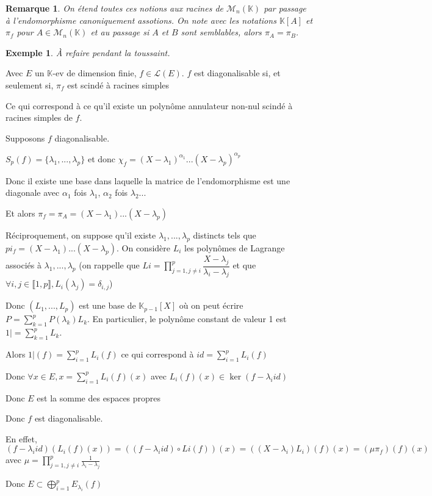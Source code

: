 \documentclass[a4paper,12pt]{book}
\newcommand{\Thr}[2]{\begin{tcolorbox}[sharp corners, colback=white,colframe=red!90!black!75, title=Théorème : #1]#2\end{tcolorbox}}
\newcommand{\Pre}[1]{\begin{tcolorbox}[sharp corners, colback=white,colframe=green!60!green!30!black!75, title=Preuve]#1\end{tcolorbox}}
\newtheorem{Exe}{Exemple}[section]
\newtheorem{Rem}{Remarque}[section]
\def\K{\mathbb{K}}
\begin{document}
\begin{Rem}
On étend toutes ces notions aux racines de $\mathcal{M}_n(\K)$ par passage à l'endomorphisme canoniquement assotions. On note avec les notations $\K[A]$ et $\pi_f$ pour $A\in\mathcal{M}_n(\K)$ et au passage si $A$ et $B$ sont semblables, alors $\pi_A=\pi_B$.
\end{Rem}
\begin{Exe}
À refaire pendant la toussaint.
\end{Exe}
\Thr{}{Avec $E$ un $\K$-ev de dimension finie, $f\in\mathcal{L}(E)$. $f$ est diagonalisable si, et seulement si, $\pi_f$ est scindé à racines simples \par Ce qui correspond à ce qu'il existe un polynôme annulateur non-nul scindé à racines simples de $f$.}
\Pre{Supposons $f$ diagonalisable. \par $S_p(f) = \{\lambda_1,...,\lambda_p\}$ et donc $\chi_f = (X-\lambda_1)^{\alpha_1}...(X-\lambda_p)^{\alpha_p}$ \par Donc il existe une base dans laquelle la matrice de l'endomorphisme est une diagonale avec $\alpha_1$ fois $\lambda_1$, $\alpha_2$ fois $\lambda_2$... \par Et alors $\pi_f = \pi_A = (X-\lambda_1)...(X-\lambda_p)$
\par Réciproquement, on suppose qu'il existe $\lambda_1,...,\lambda_p$ distincts tels que  $pi_f=(X-\lambda_1)...(X-\lambda_p)$. On considère $L_i$ les polynômes de Lagrange associés à $\lambda_1,...,\lambda_p$ (on rappelle que $Li = \prod\limits_{j=1,j\neq i}^p\dfrac{X-\lambda_j}{\lambda_i-\lambda_j}$ et que $\forall i,j\in\llbracket 1,p\rrbracket, L_i(\lambda_j) = \delta_{i,j}$) \par Donc $(L_1,...,L_p)$ est une base de $\K_{p-1}[X]$ où on peut écrire $P = \sum\limits_{k=1}^p P(\lambda_k)L_k$. En particulier, le polynôme constant de valeur 1 est $1|=\sum\limits_{k=1}^pL_k$.
\par Alors $1|(f) =\sum\limits_{i=1}^pL_i(f)$ ce qui correspond à $id = \sum\limits_{i=1}^pL_i(f)$ \par Donc $\forall x\in E, x=\sum\limits_{i=1}^pL_i(f)(x)$ avec $L_i(f)(x)\in\ker (f-\lambda_i id)$ \par Donc $E$ est la somme des espaces propres \par Donc $f$ est diagonalisable. \par En effet, $(f-\lambda_i id)(L_i(f)(x)) = ((f-\lambda_i id)\circ Li(f))(x) = ((X-\lambda_i)L_i)(f)(x) = (\mu\pi_f)(f)(x)$ avec $\mu = \prod\limits_{j=1, j\neq i}^p\frac{1}{\lambda_i-\lambda_j}$ \par Donc $E\subset \bigoplus\limits_{i=1}^p E_{\lambda_i}(f)$}
\end{document}
